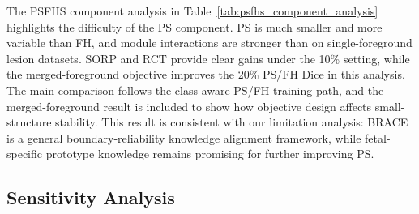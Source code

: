 \documentclass[a4paper,fleqn]{cas-dc}
\begin{document}
The PSFHS component analysis in Table~\ref{tab:psfhs_component_analysis} highlights the difficulty of the PS component. PS is much smaller and more variable than FH, and module interactions are stronger than on single-foreground lesion datasets. SORP and RCT provide clear gains under the 10\% setting, while the merged-foreground objective improves the 20\% PS/FH Dice in this analysis. The main comparison follows the class-aware PS/FH training path, and the merged-foreground result is included to show how objective design affects small-structure stability. This result is consistent with our limitation analysis: BRACE is a general boundary-reliability knowledge alignment framework, while fetal-specific prototype knowledge remains promising for further improving PS.

\subsection{Sensitivity Analysis}
\end{document}
